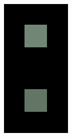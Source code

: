 \documentclass[journal,onecolumn]{IEEEtran}
\begin{document}
\begin{figure}[!htbp] \label{img:crispening-effect}
    \centering
        \begin{subfigure}[b]{0.2\textwidth}
                \centering
                \includegraphics[width=.85\linewidth, frame]{test-crisp-1}
                \caption{}
                \label{img:crispening-effect-a}
        \end{subfigure}%
        \begin{subfigure}[b]{0.2\textwidth}
                \centering

\end{subfigure}
\end{figure}
\end{document}
